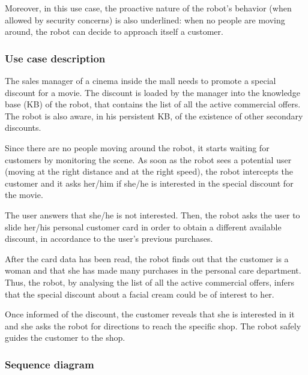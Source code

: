 Moreover, in this use case, the proactive nature of the robot's behavior (when allowed by security concerns) is also underlined: when no people are
moving around, the robot can decide to approach itself a customer.

\subsubsection{Use case description}

The sales manager of a cinema inside the mall needs to promote a special discount
for a movie. The discount is loaded by the manager into the 
knowledge base (KB) of the robot, that contains the list of all the active commercial offers.
The robot is also aware, in his persistent KB, of the
existence of other secondary discounts.

Since there are no people moving around the robot, it starts
waiting for customers by monitoring the scene. As soon as the robot
sees a potential user (moving at the right distance and at the right speed),
the robot intercepts the customer and it asks her/him if she/he is interested
in the special discount for the movie.

The user answers that she/he is not interested.
Then, the robot asks the user to slide her/his personal customer card in order to
obtain a different available discount, in accordance to the user's previous purchases.

After the card data has been read, the robot finds out that the customer is a woman and that she
has made many purchases in the personal care department. 
Thus, the robot, by analysing the list of all the active commercial offers,
infers that the special discount about a facial cream could be of interest
to her.

Once informed of the discount, the customer reveals
that she is interested in it and she asks the robot for directions to reach the specific
shop. The robot safely guides the customer to the shop.

\newpage

\subsubsection{Sequence diagram}

